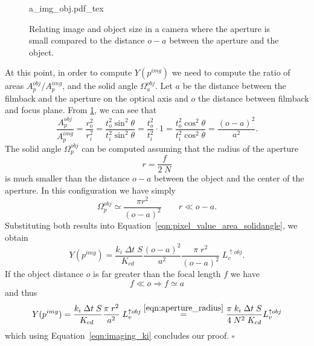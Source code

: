 \begin{figure}[t]
    \centering
    \def\svgwidth{0.9\linewidth}
    {a_img_obj.pdf_tex} 
    \caption{\label{fig:aperture_distance}%
        Relating image and object size in a camera where the aperture is small compared to the distance
        $o-a$ between the aperture and the object.}
\end{figure}

At this point, in order to compute $Y(p^{img})$ we need to compute the ratio of
areas $A_p^{obj}/A_p^{img}$, and the solid angle $\Omega_a^{obj}$. Let $a$ be the distance between the filmback and the
aperture on the optical axis and $o$ the distance between filmback and focus
plane. From \cref{fig:aperture_distance}, we can see that
\begin{equation*}
    \frac{A_p^{obj}}{A^{img}_p}
    = \frac{r_o^2}{r_i^2}
    = \frac{t_o^2 \sin^2\theta}{t_i^2 \sin^2\theta}
    = \frac{t_o^2}{t_i^2} \cdot 1
    = \frac{t_o^2 \cos^2\theta}{t_i^2 \cos^2\theta}
    = \frac{(o-a)^2}{a^2}.
\end{equation*}
The solid angle $\Omega_p^{obj}$ can be computed assuming that the radius of the
aperture 
\begin{equation}\label{eqn:aperture_radius}
    r = \frac{f}{2\;N}
\end{equation}
is much smaller than the distance $o-a$ between the object
and the center of the aperture. In this configuration we have simply
\begin{equation}\label{eqn:imaging_omegapobj}
\Omega_p^{obj} \simeq \frac{\pi r^2}{(o-a)^2} \qquad r \ll o-a.
\end{equation}
Substituting both results into Equation~\eqref{eqn:pixel_value_area_solidangle}, we obtain
\begin{equation}\label{eqn:imaging_y2}
Y(p^{img}) =  \frac{k_i\; \Delta t \; S}{K_{cd}\;} \frac{(o-a)^2}{a^2} \frac{\pi\;r^2}{(o-a)^2}\; L_v^{\uparrow obj}.
\end{equation}
If the object distance $o$ is far greater than the focal length $f$ we have
\begin{equation}
f \ll o \Rightarrow  f \simeq a
\end{equation}
and thus
\begin{equation}
  Y(p^{img}) =  \frac{k_i\; \Delta t \; S}{K_{cd}\;} \frac{\pi\;r^2}{a^2}\; L_v^{\uparrow obj} \stackrel{\eqref{eqn:aperture_radius}}{=}
   \frac{\pi\; k_i\; \Delta t \; S}{4\;N^2\;K_{cd}} L_v^{\uparrow obj} 
\end{equation}
which using Equation~\eqref{eqn:imaging_ki} concludes our proof. \hfill $\square$

